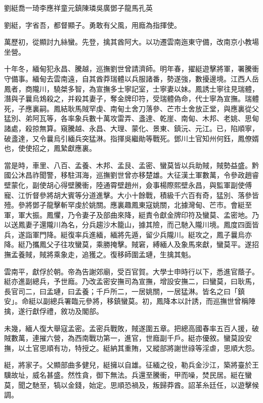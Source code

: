 
\begin{pinyinscope}
劉綎喬一琦李應祥童元鎮陳璘吳廣鄧子龍馬孔英

劉綎，字省吾，都督顯子。勇敢有父風，用廕為指揮使。

萬歷初，從顯討九絲蠻。先登，擒其酋阿大。以功遷雲南迤東守備，改南京小教場坐營。

十年冬，緬甸犯永昌、騰越，巡撫劉世曾請濟師。明年春，擢綎遊擊將軍，署騰衝守備事。緬甸去雲南遠，自其酋莽瑞體以兵服諸番，勢遂強，數擾邊境。江西人岳鳳者，商隴川，驍桀多智，為宣撫多士寧記室，士寧妻以妹。鳳誘士寧往見瑞體，潛與子曩烏鴆殺之，并殺其妻子，奪金牌印符，受瑞體偽命，代士寧為宣撫。瑞體死，子應裏嗣。鳳結耿馬賊罕虔、南甸土舍刀落參、芒市土舍放正堂，與應裏從父猛別、弟阿瓦等，各率象兵數十萬攻雷弄、盞達、乾崖、南甸、木邦、老姚、思甸諸處，殺掠無算。窺騰越、永昌、大理、蒙化、景東、鎮沅、元江。已，陷順寧，破盞達，又令曩烏引緬兵突猛淋。指揮吳繼勛等戰死。鄧川土官知州何鈺，鳳僚婿也，使使招之，鳳縶獻應裏。

當是時，車里、八百、孟養、木邦、孟艮、孟密、蠻莫皆以兵助賊，賊勢益盛。黔國公沐昌祚聞警，移駐洱海，巡撫劉世曾亦移楚雄。大征漢土軍數萬，令參政趙睿壁蒙化，副使胡心得壁騰衝，陸通霄壁趙州，僉事楊際熙壁永昌，與監軍副使傅寵、江忻督參將胡大賓等分道進擊。大小十餘戰，積級千六百有奇，猛別、落參皆殪。參將鄧子龍擊斬罕虔於姚關。應裏趣鳳東寇姚關，北據灣甸、芒市。會綎至軍，軍大振。鳳懼，乃令妻子及部曲來降，綎責令獻金牌印符及蠻莫、孟密地。乃以送鳳妻子還隴川為名，分兵趨沙木籠山，據其險，而己馳入隴川境。鳳度四面皆兵，遂詣軍門降。綎復率兵進緬，緬將先遁，留少兵隴川。綎攻之，鳳子曩烏亦降。綎乃攜鳳父子往攻蠻莫，乘勝掩擊。賊窘，縛緬人及象馬來獻，蠻莫平。遂招撫孟養賊，賊將乘象走，追獲之。復移師圍孟璉，生擒其魁。

雲南平，獻俘於朝。帝為告謝郊廟，受百官賀。大學士申時行以下，悉進官蔭子。綎亦進副總兵，予世廕。乃改孟密安撫司為宣撫，增設安撫二，曰蠻莫，曰耿馬，長官司二，曰孟璉，曰孟養；千戶所二，一居姚關，一居猛淋。皆名之曰「鎮安」。命綎以副總兵署臨元參將，移鎮蠻莫。初，鳳降本以計誘，而巡撫世曾稱陣擒，遂行獻俘禮，敘功及閣部。

未幾，緬人復大舉寇孟密。孟密兵戰敗，賊遂圍五章。把總高國春率五百人援，破賊數萬，連摧六營，為西南戰功第一，進官，世廕副千戶。綎亦優敘。蠻莫設安撫，以土官思順有功，特授之。綎納其重賄，又縱部將謝世祿等淫虐，思順大怨。

綎，將家子。父顯部曲多健兒，綎擁以自雄。征緬之役，勒兵金沙江，築將臺於王驥故址，威名甚盛。然性貪，御下無法。兵還至騰衝，甲而噪，焚民居。綎在蠻莫，聞之馳至，犒以金錢，始定。思順恐禍及，叛歸莽酋。詔革糸廷任，以遊擊候調。


\end{pinyinscope}
